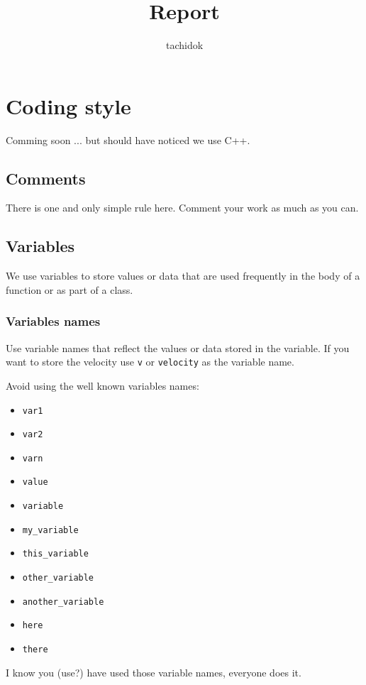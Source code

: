 \documentclass[12pt,a4paper,final]{report} %
\author{tachidok}
\title{Report}
\begin{document}
\tableofcontents
\listoffigures
\listoftables
\chapter{Coding style}
Comming soon ... but should have noticed we use C++.

\section{Comments}
There is one and only simple rule here. Comment your work as much as
you can.

\section{Variables}
We use variables to store values or data that are used frequently in
the body of a function or as part of a class.

\subsection{Variables names}
Use variable names that reflect the values or data stored in the
variable. If you want to store the velocity use \texttt{v} or
\texttt{velocity} as the variable name.

Avoid using the well known variables names:
\begin{itemize}
  \item \texttt{var1}\\
  \item \texttt{var2}\\
  \item \texttt{varn}\\
  \item \texttt{value}\\
  \item \texttt{variable}\\
  \item \texttt{my\_variable}\\
  \item \texttt{this\_variable}\\
  \item \texttt{other\_variable}\\
  \item \texttt{another\_variable}\\
  \item \texttt{here}\\
  \item \texttt{there}
\end{itemize}
I know you (use?) have used those variable names, everyone does it.
\end{document}
